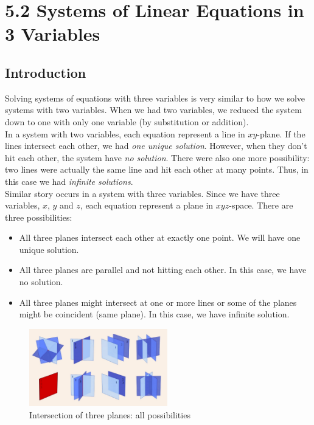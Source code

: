 \chapter{5.2 Systems of Linear Equations in 3 Variables}
\section{Introduction}
Solving systems of equations with three variables is very similar to how we solve systems with two variables. When we had two variables, we reduced the system down to one with only one variable (by substitution or addition).\\
In a system with two variables, each equation represent a line in $xy$-plane. If the lines intersect each other, we had \textit{one unique solution}. However, when they don't hit each other, the system have \textit{no solution}. There were also one more possibility: two lines were actually the same line and hit each other at many points. Thus, in this case we had \textit{infinite solutions}.\\
Similar story occurs in a system with three variables. Since we have three variables, $x$, $y$ and $z$, each equation represent a plane in $xyz$-space. There are three possibilities:
%
\begin{itemize}
	\item All three planes intersect each other at exactly one point. We will have one unique solution.
	\item All three planes are parallel and not hitting each other. In this case, we have no solution.
	\item All three planes might intersect at one or more lines or some of the planes might be coincident (same plane). In this case, we have infinite solution.  
\end{itemize}
%
\begin{figure}[H]
 \includegraphics[width=6cm]{pics/planes.jpg}
 \centering
  \caption{Intersection of three planes: all possibilities}
  \label{fig:planes}
\end{figure}

